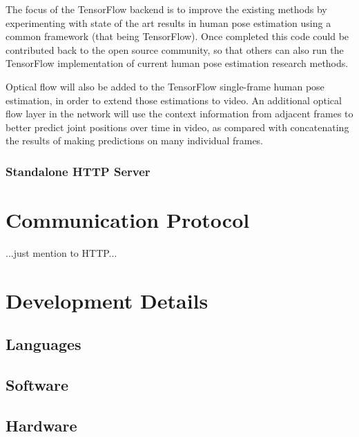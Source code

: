 \documentclass{scrreprt}
\begin{document}
The focus of the TensorFlow backend is to improve the existing methods by
experimenting with state of the art results in human pose estimation using a
common framework (that being TensorFlow). Once completed this code could be
contributed back to the open source community, so that others can also run the
TensorFlow implementation of current human pose estimation research methods.

Optical flow will also be added to the TensorFlow single-frame human pose
estimation, in order to extend those estimations to video. An additional
optical flow layer in the network will use the context information from
adjacent frames to better predict joint positions over time in video, as
compared with concatenating the results of making predictions on many
individual frames.

\subsection{Standalone HTTP Server}



\chapter{Communication Protocol}

...just mention to HTTP...


\chapter{Development Details}

\section{Languages}
\section{Software}
\section{Hardware}
\end{document}
